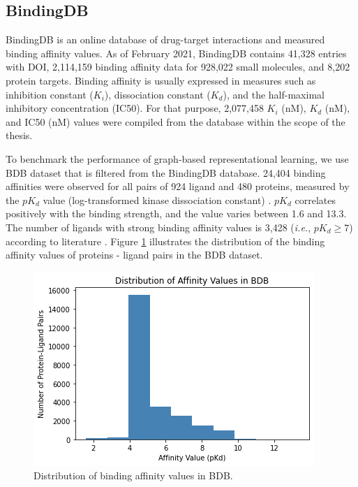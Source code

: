 \newpage
\subsection{BindingDB}
BindingDB \cite{gilson2016bindingdb} is an online database of drug-target interactions and measured binding affinity values. As of February 2021, BindingDB contains 41,328 entries with DOI, 2,114,159 binding affinity data for 928,022 small molecules, and 8,202 protein targets. Binding affinity is usually expressed in measures such as inhibition constant ($K_i$), dissociation constant ($K_d$), and the half-maximal inhibitory concentration (IC50). For that purpose, 2,077,458 $K_i$ (nM), $K_d$ (nM), and IC50 (nM) values were compiled from the database within the scope of the thesis. 

To benchmark the performance of graph-based representational learning, we use BDB dataset \cite{ozccelik2021chemboost} that is filtered from the BindingDB database. 24,404 binding affinities were observed for all pairs of 924 ligand and 480 proteins, measured by the $pK_d$ value (log-transformed kinase dissociation constant) \cite{ozccelik2021chemboost}. $pK_d$ correlates positively with the binding strength, and the value varies between 1.6 and 13.3. The number of ligands with strong binding affinity values is 3,428 (\textit{i.e.}, $pK_d \geq 7$) according to literature \cite{he2017simboost}. Figure \ref{fig:bdb} illustrates the distribution of the binding affinity values of proteins - ligand pairs in the BDB dataset. 
\begin{figure}
    \centering
        \includegraphics[width=0.5\linewidth]{chapters/materials_and_methods/datasetpreparation/figures/bdb.png} 
    \caption{Distribution of binding affinity values in BDB.}
    \label{fig:bdb}
\end{figure}

